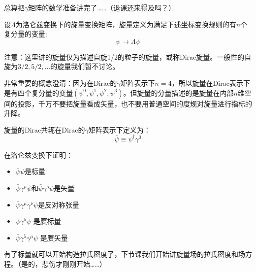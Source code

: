\documentclass[CJK]{beamer}
\begin{document}
\begin{frame}
\bch

总算把$\gamma$矩阵的数学准备讲完了……（退课还来得及吗？）

\ech
\end{frame}




\begin{frame}
\bch
设$\Lambda$为洛仑兹变换下的旋量变换矩阵，旋量定义为满足下述坐标变换规则的有$n$个复分量的变量:
$$\psi \rightarrow \Lambda \psi$$

\skipline
注意：这里讲的旋量仅为描述自旋1/2的粒子的旋量，或称Dirac旋量。一般性的自旋为$3/2,5/2,...$的旋量我们暂不讨论。

\skipline
非常重要的概念澄清：因为在Dirac的$\gamma$矩阵表示下$n=4$，所以旋量在Dirac表示下是有四个复分量的变量$(\psi^0,\psi^1, \psi^2, \psi^3)$。但旋量的分量描述的是旋量在内部$n$维空间的投影，千万不要把旋量看成矢量，也不要用普通空间的度规对旋量进行指标的升降。
\ech
\end{frame}


\begin{frame}
\bch
旋量的Dirac共轭在Dirac的$\gamma$矩阵表示下定义为：
$$\bar\psi \equiv \psi^\dagger \gamma^0$$

在洛仑兹变换下证明：
\begin{itemize}
\item{$\bar\psi \psi$是标量}
\item{$\bar\psi\gamma^\mu\psi$和$\bar\psi\gamma^5\psi$是矢量}
\item{$\bar\psi\gamma^\mu\gamma^\nu\psi$是反对称张量}
\item{$\bar\psi\gamma^5\psi$ 是赝标量}
\item{$\bar\psi\gamma^5\gamma^\mu\psi$ 是赝矢量}
\end{itemize}

\ech
\end{frame}

\begin{frame}
\bch
有了标量就可以开始构造拉氏密度了，下节课我们开始讲旋量场的拉氏密度和场方程。（是的，悲伤才刚刚开始……）
\ech
\end{frame}
\end{document}
